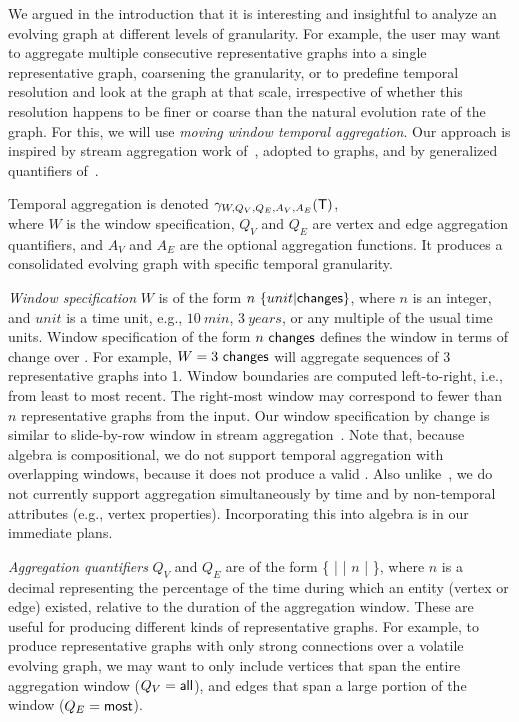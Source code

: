 We argued in the introduction that it is interesting and insightful to
analyze an evolving graph at different levels of granularity.  For
example, the user may want to aggregate multiple consecutive
representative graphs into a single representative graph, coarsening
the granularity, or to predefine temporal resolution and look at the
graph at that scale, irrespective of whether this resolution happens
to be finer or coarse than the natural evolution rate of the graph.
For this, we will use {\em moving window temporal aggregation}.  Our
approach is inspired by stream aggregation work of~\cite{Li2005},
adopted to graphs, and by generalized quantifiers of~\cite{Hsu1995}.

Temporal aggregation is denoted $\gamma_{W,Q_V,Q_E,A_V,A_E} (\mathsf{T})$,\\
where $W$ is the window specification, $Q_V$ and $Q_E$ are vertex and
edge aggregation quantifiers, and $A_V$ and $A_E$ are the optional
aggregation functions.  It produces a consolidated evolving graph with
specific temporal granularity.

{\em Window specification} $W$ is of the form
$n~\{unit|\textsf{changes}\}$, where $n$ is an integer, and $unit$ is a
time unit, e.g., $10~min$, $3~years$, or any multiple of the usual
time units.  Window specification of the form $n~\textsf{changes}$
defines the window in terms of change over \trg.  For example,
$W=3~\textsf{changes}$ will aggregate sequences of 3 representative
graphs into 1.  Window boundaries are computed left-to-right, i.e.,
from least to most recent.  The right-most window may correspond to
fewer than $n$ representative graphs from the input.
%
Our window specification by change is similar to slide-by-row window
in stream aggregation~\cite{Li2005}.  Note that, because \tg algebra
is compositional, we do not support temporal aggregation with
overlapping windows, because it does not produce a valid \tg. Also
unlike~\cite{Li2005}, we do not currently support aggregation
simultaneously by time and by non-temporal attributes (e.g., vertex
properties). Incorporating this into \tg algebra is in our immediate
plans.

{\em Aggregation quantifiers} $Q_V$ and $Q_E$ are of the form \{
 |  |  $n$ |  \},
where $n$ is a decimal representing the percentage of the time during
which an entity (vertex or edge) existed, relative to the duration of
the aggregation window. These are useful for producing different kinds
of representative graphs.  For example, to produce representative
graphs with only strong connections over a volatile evolving graph, we
may want to only include vertices that span the entire aggregation
window ($Q_V=\textsf{all}$), and edges that span a large portion of the
window ($Q_E=\textsf{most}$).
 

